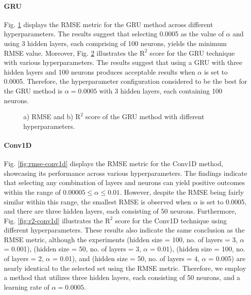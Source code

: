\documentclass[conference]{IEEEtran}
\begin{document}
{\begin{appendices}
\paragraph{GRU}
Fig. \ref{fig:rmse-gru} displays the RMSE metric for the GRU method across different hyperparameters. The results suggest that selecting 0.0005 as the value of $\alpha$ and using 3 hidden layers, each comprising of 100 neurons, yields the minimum RMSE value. Moreover, Fig. \ref{fig:r2-gru} illustrates the $\text{R}^2$ score for the GRU technique with various hyperparameters. The results suggest that using a GRU with three hidden layers and 100 neurons produces acceptable results when $\alpha$ is set to 0.0005. Therefore, the hyperparameter configuration considered to be the best for the GRU method is $\alpha=0.0005$ with 3 hidden layers, each containing 100 neurons.

\begin{figure}[htbp]
    \centering
    \begin{subfigure}[b]{0.5\linewidth}
        \centering
        
        \caption{}
        \label{fig:rmse-gru}
    \end{subfigure}%
    \begin{subfigure}[b]{0.5\linewidth}
        \centering
        
        \caption{}
        \label{fig:r2-gru}
    \end{subfigure}
    \caption{a) RMSE and b) $\text{R}^2$ score of the GRU method with different hyperparameters.}
    \label{fig:gru-hypers}
    \vspace{-4mm}
\end{figure}

\paragraph{Conv1D}
Fig. \ref{fig:rmse-conv1d} displays the RMSE metric for the Conv1D method, showcasing its performance across various hyperparameters. The findings indicate that selecting any combination of layers and neurons can yield positive outcomes within the range of $0.00005 \le \alpha \le 0.01$. However, despite the RMSE being fairly similar within this range, the smallest RMSE is observed when $\alpha$ is set to 0.0005, and there are three hidden layers, each consisting of 50 neurons. Furthermore, Fig. \ref{fig:r2-conv1d} illustrates the $\text{R}^2$ score for the Conv1D technique using different hyperparameters. These results also indicate the same conclusion as the RMSE metric, although the experiments (hidden size = 100, no. of layers = 3, $\alpha$ = 0.001), (hidden size = 50, no. of layers = 3, $\alpha$ = 0.01), (hidden size = 100, no. of layers = 2, $\alpha$ = 0.01), and (hidden size = 50, no. of layers = 4, $\alpha$ = 0.005) are nearly identical to the selected set using the RMSE metric. Therefore, we employ a method that utilizes three hidden layers, each consisting of 50 neurons, and a learning rate of $\alpha=0.0005$. 


\end{appendices}}
\end{document}
